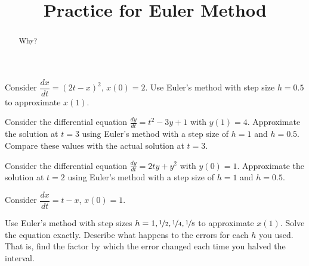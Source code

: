 \documentclass{ximera}
\title{Practice for Euler Method}
\begin{document}
\begin{abstract}
    Why?
\end{abstract}
\maketitle


\begin{exercise}
    Consider $\dfrac{dx}{dt} = {(2t-x)}^2$, $x(0)=2$.  Use Euler's method with step size $h=0.5$ to approximate $x(1)$.
\end{exercise}

\begin{exercise}
    Consider the differential equation $\frac{dy}{dt} = t^2 - 3y + 1$ with $y(1) = 4$. Approximate the solution at $t=3$ using Euler's method with a step size of $h=1$ and $h=0.5$. Compare these values with the actual solution at $t=3$. 
\end{exercise}

\begin{exercise}
    Consider the differential equation $\frac{dy}{dt} = 2ty + y^2$ with $y(0) = 1$. Approximate the solution at $t=2$ using Euler's method with a step size of $h=1$ and $h=0.5$.
\end{exercise}

\begin{samepage}
    \begin{exercise}
        Consider $\dfrac{dx}{dt} = t-x$, $x(0)=1$.
        \begin{tasks}
            \task Use Euler's method with step sizes $h = 1, \nicefrac{1}{2}, \nicefrac{1}{4}, \nicefrac{1}{8}$ to approximate $x(1)$. 
            \task Solve the equation exactly.
            \task Describe what happens to the errors for each $h$ you used.  That is, find the factor by which the error changed each time you halved the interval.
        \end{tasks}
    \end{exercise}
\end{samepage}
\end{document}

